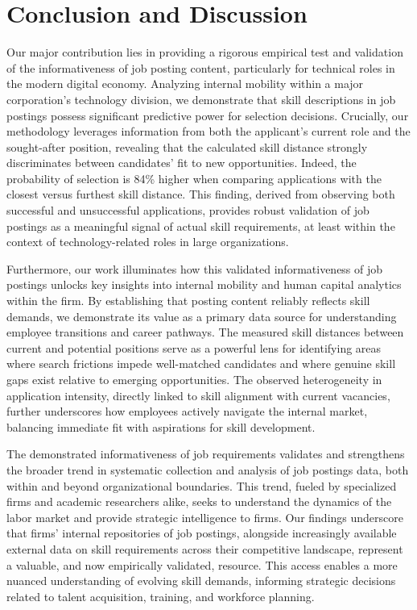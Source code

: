 \section{Conclusion and Discussion}\label{sec:conclusion_discussion}

Our major contribution lies in providing a rigorous empirical test and validation of the informativeness of job posting content, 
particularly for technical roles in the modern digital economy. Analyzing internal mobility within a major corporation's technology division, 
we demonstrate that skill descriptions in job postings possess significant predictive power for selection decisions. Crucially, our methodology 
leverages information from both the applicant's current role and the sought-after position, revealing that the calculated skill distance strongly 
discriminates between candidates' fit to new opportunities. Indeed, the probability of selection is 84\% higher when comparing applications with 
the closest versus furthest skill distance. This finding, derived from observing both successful and unsuccessful applications, provides robust 
validation of job postings as a meaningful signal of actual skill requirements, at least within the context of technology-related roles in large organizations.

Furthermore, our work illuminates how this validated informativeness of job postings unlocks key insights into internal mobility and 
human capital analytics within the firm. By establishing that posting content reliably reflects skill demands, we demonstrate its value 
as a primary data source for understanding employee transitions and career pathways. The measured skill distances between current and 
potential positions serve as a powerful lens for identifying areas where search frictions impede well-matched candidates and where genuine 
skill gaps exist relative to emerging opportunities. The observed heterogeneity in application intensity, directly linked to skill alignment 
with current vacancies, further underscores how employees actively navigate the internal market, balancing immediate fit with aspirations for 
skill development.

The demonstrated informativeness of job requirements validates and strengthens the broader trend in systematic collection and analysis of job postings data, 
both within and beyond organizational boundaries. This trend, fueled by specialized firms and academic researchers alike, seeks to understand the dynamics of 
the labor market and provide strategic intelligence to firms. Our findings underscore that firms' internal repositories of job postings, alongside increasingly 
available external data on skill requirements across their competitive landscape, represent a valuable, and now empirically validated, resource. This access 
enables a more nuanced understanding of evolving skill demands, informing strategic decisions related to talent acquisition, training, and workforce planning.

